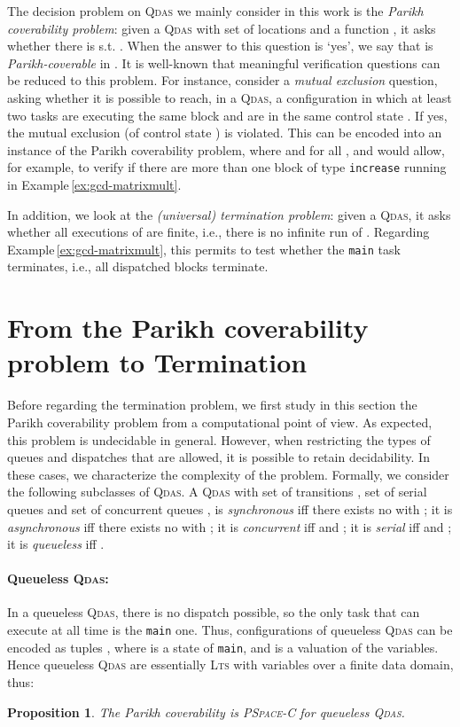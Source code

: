\documentclass[runningheads,oribibl,]{article}
\newcommand{\lts}{\textsc{Lts}\xspace}
\newcommand{\qdas}{\textsc{Qdas}\xspace}
\newcommand{\pspacecomplete}{\textsc{PSpace-C}\xspace}
\newtheorem{proposition}{Proposition}{}
\begin{document}
 The decision problem on \qdas we mainly consider in this work is the
 \emph{Parikh coverability problem}: given a \qdas  with set of
 locations  and a function , it asks whether
 there is 
 s.t. . When the answer to this question is `yes',
 we say that  is \emph{Parikh-coverable} in . It is well-known
 that meaningful verification questions can be reduced to this
 problem. For instance, consider a \emph{mutual exclusion} question,
 asking whether it is possible to reach, in a \qdas , a
 configuration in which at least two tasks are executing the same
 block  and are in the same control state . If yes, the
 mutual exclusion (of control state ) is violated. This can be
 encoded into an instance of the Parikh coverability problem, where
  and  for all , and would allow,
 for example, to verify if there are more than one block of type
 \texttt{increase} running in
 Example\,\ref{ex:gcd-matrixmult}.

 In addition, we look at the \emph{(universal) termination problem}:
 given a \qdas , it asks whether all executions of  are
 finite, i.e., there is no infinite run of .
 Regarding Example\,\ref{ex:gcd-matrixmult}, this
 permits to test whether the \texttt{main} task terminates, i.e.,
 all dispatched blocks terminate.



\section{From the Parikh coverability problem to Termination\label{sec:parikh-cover-probl}}

Before regarding the termination problem, we first study
in this section the Parikh coverability problem from a
computational point of view. As expected, this problem is undecidable
in general. However, when restricting the types of queues and
dispatches that are allowed, it is possible to retain decidability. In
these cases, we characterize the complexity of the problem. Formally,
we consider the following subclasses of \qdas. A \qdas  with set
of transitions , set of serial queues  and set of
concurrent queues , is \emph{synchronous} iff there exists no
 with ; it is \emph{asynchronous} iff there exists no
 with ; it is \emph{concurrent} iff  and
; it is \emph{serial} iff  and
; it is \emph{queueless} iff
.


\paragraph{\bf Queueless \qdas:} In a queueless \qdas, there is no dispatch
possible, so the only task that can execute at all time is the
\texttt{main} one. Thus, configurations of queueless \qdas can be
encoded as tuples , where  is a state of
\texttt{main}, and  is a valuation of the variables.
Hence queueless \qdas are essentially \lts with variables over
a finite data domain, thus:
\begin{proposition}\label{prop:queueless}
  The Parikh coverability is \pspacecomplete
  for queueless \qdas.
\end{proposition}
\end{document}
